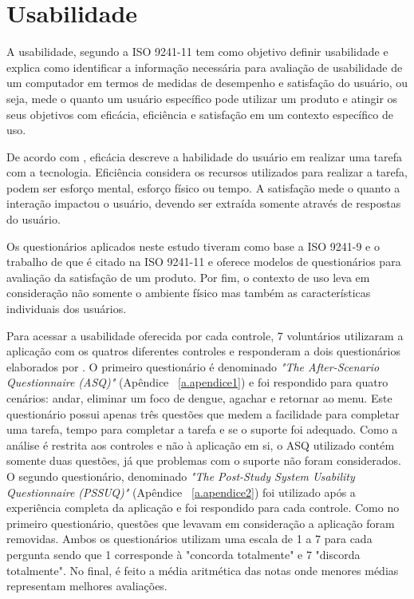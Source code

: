 \section{Usabilidade}

A usabilidade, segundo a ISO 9241-11 \cite{iso9241} tem como objetivo definir usabilidade e explica como identificar a informação necessária para avaliação de usabilidade de um computador em termos de medidas de desempenho e satisfação do usuário, ou seja, mede o quanto um usuário específico pode utilizar um produto e atingir os seus objetivos com eficácia, eficiência e satisfação em um contexto específico de uso.

De acordo com , eficácia descreve a habilidade do usuário em realizar uma tarefa com a tecnologia. Eficiência considera os recursos utilizados para realizar a tarefa, podem ser esforço mental, esforço físico ou tempo. A satisfação mede o quanto a interação impactou o usuário, devendo ser extraída somente através de respostas do usuário. 

Os questionários aplicados neste estudo tiveram como base a ISO 9241-9 e o trabalho de  que é citado na ISO 9241-11 e oferece modelos de questionários para avaliação da satisfação de um produto. Por fim, o contexto de uso leva em consideração não somente o ambiente físico mas também as características individuais dos usuários. 

Para acessar a usabilidade oferecida por cada controle, 7 voluntários utilizaram a aplicação com os quatros diferentes controles e responderam a dois questionários elaborados por . O primeiro questionário é denominado \textit{"The After-Scenario Questionnaire (ASQ)"} (Apêndice ~\ref{a.apendice1}) e foi respondido para quatro cenários: andar, eliminar um foco de dengue, agachar e retornar ao menu. Este questionário possui apenas três questões que medem a facilidade para completar uma tarefa, tempo para completar a tarefa e se o suporte foi adequado. Como a análise é restrita aos controles e não à aplicação em si, o ASQ utilizado contém somente duas questões, já que problemas com o suporte não foram considerados. O segundo questionário, denominado \textit{"The Post-Study System Usability Questionnaire (PSSUQ)"} (Apêndice ~\ref{a.apendice2}) foi utilizado após a experiência completa da aplicação e foi respondido para cada controle. Como no primeiro questionário, questões que levavam em consideração a aplicação foram removidas. Ambos os questionários utilizam uma escala de 1 a 7 para cada pergunta sendo que 1 corresponde à "concorda totalmente" e 7 "discorda totalmente". No final, é feito a média aritmética das notas onde menores médias representam melhores avaliações.  

